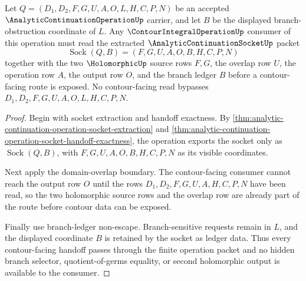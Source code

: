 \begin{theorem}
\label{thm:analytic-continuation-operation-contour-socket-handoff}
Let $Q=(D_1,D_2,F,G,U,A,O,L,H,C,P,N)$ be an accepted $\AnalyticContinuationOperationUp$ carrier, and let $B$ be the displayed branch-obstruction coordinate of $L$. Any $\ContourIntegralOperationUp$ consumer of this operation must read the extracted $\AnalyticContinuationSocketUp$ packet
$$
\operatorname{Sock}(Q,B)=(F,G,U,A,O,B,H,C,P,N)
$$
together with the two $\HolomorphicUp$ source rows $F,G$, the overlap row $U$, the operation row $A$, the output row $O$, and the branch ledger $B$ before a contour-facing route is exposed. No contour-facing read bypasses $D_1,D_2,F,G,U,A,O,L,H,C,P,N$.
\end{theorem}
\begin{proof}
Begin with socket extraction and handoff exactness. By \autoref{thm:analytic-continuation-operation-socket-extraction} and \autoref{thm:analytic-continuation-operation-socket-handoff-exactness}, the operation exports the socket only as $\operatorname{Sock}(Q,B)$, with $F,G,U,A,O,B,H,C,P,N$ as its visible coordinates.

Next apply the domain-overlap boundary. The contour-facing consumer cannot reach the output row $O$ until the rows $D_1,D_2,F,G,U,A,H,C,P,N$ have been read, so the two holomorphic source rows and the overlap row are already part of the route before contour data can be exposed.

Finally use branch-ledger non-escape. Branch-sensitive requests remain in $L$, and the displayed coordinate $B$ is retained by the socket as ledger data. Thus every contour-facing handoff passes through the finite operation packet and no hidden branch selector, quotient-of-germs equality, or second holomorphic output is available to the consumer.
\end{proof}

